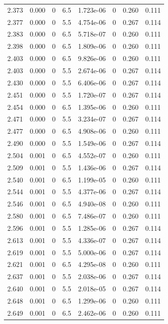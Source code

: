\documentclass[preview]{standalone}
\begin{document}
{{{{{{\begin{tabular}{L{1.2cm}C{1.2cm} C{0.3cm}C{0.5cm} C{1.4cm}C{1.4cm} C{1.4cm}C{1.4cm}}
  2.373  &  0.000  & 0     & 6.5 &  1.723e-06  & 0  & 0.260 &  0.111   \\ 
  2.377  &  0.000  & 0     & 5.5 &  4.754e-06  & 0  & 0.267 &  0.114   \\ 
  2.383  &  0.000  & 0     & 6.5 &  5.718e-07  & 0  & 0.260 &  0.111   \\ 
  2.398  &  0.000  & 0     & 6.5 &  1.809e-06  & 0  & 0.260 &  0.111   \\ 
  2.403  &  0.000  & 0     & 6.5 &  9.826e-06  & 0  & 0.260 &  0.111   \\ 
  2.403  &  0.000  & 0     & 5.5 &  2.674e-06  & 0  & 0.267 &  0.114   \\ 
  2.430  &  0.000  & 0     & 5.5 &  6.406e-06  & 0  & 0.267 &  0.114   \\ 
  2.451  &  0.000  & 0     & 5.5 &  1.720e-07  & 0  & 0.267 &  0.114   \\ 
  2.454  &  0.000  & 0     & 6.5 &  1.395e-06  & 0  & 0.260 &  0.111   \\ 
  2.471  &  0.000  & 0     & 5.5 &  3.234e-07  & 0  & 0.267 &  0.114   \\ 
  2.477  &  0.000  & 0     & 6.5 &  4.908e-06  & 0  & 0.260 &  0.111   \\ 
  2.490  &  0.000  & 0     & 5.5 &  1.549e-06  & 0  & 0.267 &  0.114   \\ 
  2.504  &  0.001  & 0     & 6.5 &  4.552e-07  & 0  & 0.260 &  0.111   \\ 
  2.509  &  0.001  & 0     & 5.5 &  1.436e-06  & 0  & 0.267 &  0.114   \\ 
  2.540  &  0.001  & 0     & 6.5 &  1.199e-05  & 0  & 0.260 &  0.111   \\ 
  2.544  &  0.001  & 0     & 5.5 &  4.377e-06  & 0  & 0.267 &  0.114   \\ 
  2.546  &  0.001  & 0     & 6.5 &  4.940e-08  & 0  & 0.260 &  0.111   \\ 
  2.580  &  0.001  & 0     & 6.5 &  7.486e-07  & 0  & 0.260 &  0.111   \\ 
  2.596  &  0.001  & 0     & 5.5 &  1.285e-06  & 0  & 0.267 &  0.114   \\ 
  2.613  &  0.001  & 0     & 5.5 &  4.336e-07  & 0  & 0.267 &  0.114   \\ 
  2.619  &  0.001  & 0     & 5.5 &  5.000e-06  & 0  & 0.267 &  0.114   \\ 
  2.621  &  0.001  & 0     & 6.5 &  4.295e-08  & 0  & 0.260 &  0.111   \\ 
  2.637  &  0.001  & 0     & 5.5 &  2.038e-06  & 0  & 0.267 &  0.114   \\ 
  2.640  &  0.001  & 0     & 5.5 &  2.018e-05  & 0  & 0.267 &  0.114   \\ 
  2.648  &  0.001  & 0     & 6.5 &  1.299e-06  & 0  & 0.260 &  0.111   \\ 
  2.649  &  0.001  & 0     & 6.5 &  2.462e-06  & 0  & 0.260 &  0.111   \\ 
\hline 
\end{tabular} 

}}}}}}
\end{document}
